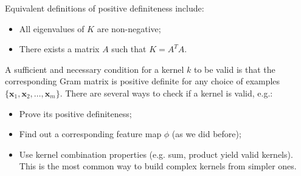 Equivalent definitions of positive definiteness include:
\begin{itemize}
    \item All eigenvalues of $K$ are non-negative;
    \item There exists a matrix $A$ such that $K = A^T A$.
\end{itemize}
A sufficient and necessary condition for a kernel $k$ to be valid is that 
the corresponding Gram matrix is positive definite for any choice of examples 
$\{\boldsymbol{x}_1, \boldsymbol{x}_2, \ldots, \boldsymbol{x}_m\}$.
There are several ways to check if a kernel is valid, e.g.:
\begin{itemize}
    \item Prove its positive definiteness;
    \item Find out a corresponding feature map $\phi$ (as we did before);
    \item Use kernel combination properties (e.g. sum, product yield valid kernels).
    This is the most common way to build complex kernels from simpler ones.
\end{itemize}
